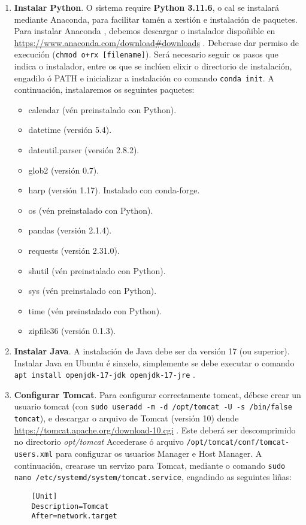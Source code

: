 \begin{enumerate}
    \item \textbf{Instalar Python}. O sistema require \textbf{Python 3.11.6}, o cal se instalará mediante Anaconda, para facilitar tamén a xestión e instalación de paquetes. Para instalar Anaconda
    , debemos descargar o instalador dispoñible en \url{https://www.anaconda.com/download#downloads} . Deberase dar permiso de execución (\texttt{chmod o+rx [filename]}). Será necesario seguir os
    pasos que indica o instalador, entre os que se inclúen elixir o directorio de instalación, engadilo ó PATH e inicializar a instalación co comando \texttt{conda init}. A continuación, 
    instalaremos os seguintes paquetes:
    \begin{itemize}
        \item calendar (vén preinstalado con Python).
        \item datetime (versión 5.4).
        \item dateutil.parser (versión 2.8.2).
        \item glob2 (versión 0.7).
        \item harp (versión 1.17). Instalado con conda-forge.
        \item os (vén preinstalado con Python).
        \item pandas (versión 2.1.4).
        \item requests (versión 2.31.0).
        \item shutil (vén preinstalado con Python).
        \item sys (vén preinstalado con Python).
        \item time (vén preinstalado con Python).
        \item zipfile36 (versión 0.1.3).
    \end{itemize}
    \item \textbf{Instalar Java}. A instalación de Java debe ser da versión 17 (ou superior). Instalar Java en Ubuntu é sinxelo, simplemente se debe executar o comando \texttt{apt install openjdk-17-jdk
    openjdk-17-jre} .
    \item \textbf{Configurar Tomcat}. Para configurar correctamente tomcat, débese crear un usuario tomcat (con \texttt{sudo useradd -m -d /opt/tomcat -U -s /bin/false tomcat}), e descargar o
    arquivo de Tomcat (versión 10) dende \url{https://tomcat.apache.org/download-10.cgi} . Este deberá ser descomprimido no directorio \textit{opt/tomcat} Accederase ó arquivo \texttt{/opt/tomcat/conf/tomcat-users.xml}
    para configurar os usuarios Manager e Host Manager. A continuación, crearase un servizo para Tomcat, mediante o comando \texttt{sudo nano \break/etc/systemd/system/tomcat.service}, engadindo as
    seguintes liñas:
    \lstset{numbers=left,breaklines=true}
    \begin{lstlisting}
    [Unit]
    Description=Tomcat
    After=network.target


\end{lstlisting}
\end{enumerate}
